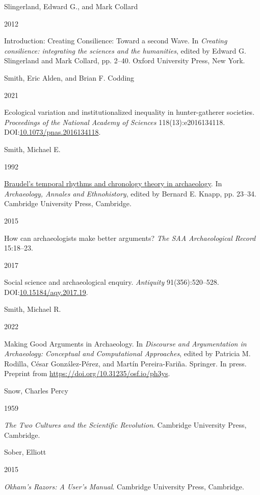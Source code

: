 \documentclass[
  12pt,
  a4paper,
  oneside]{book}
\newlength{\cslhangindent}
\newlength{\csllabelwidth}
\newlength{\cslentryspacingunit} %
\newenvironment{CSLReferences}[2] %
 {%
  \setlength{\parindent}{0pt}
  \ifodd #1
  \let\oldpar\par
  \def\par{\hangindent=\cslhangindent\oldpar}
  \fi
  \setlength{\parskip}{#2\cslentryspacingunit}
 }%
 {}
\newcommand{\CSLBlock}[1]{#1\hfill\break}
\newcommand{\CSLLeftMargin}[1]{\parbox[t]{\csllabelwidth}{#1}}
\newcommand{\CSLRightInline}[1]{\parbox[t]{\linewidth - \csllabelwidth}{#1}\break}
\begin{document}
\begin{CSLReferences}{0}{0}
\leavevmode{}%
\CSLBlock{Slingerland, Edward G., and Mark Collard}
\CSLLeftMargin{ 2012}%
\CSLRightInline{{Introduction: Creating Consilience: Toward a second Wave}. In \emph{{Creating consilience: integrating the sciences and the humanities}}, edited by Edward G. Slingerland and Mark Collard, pp. 2--40. Oxford University Press, New York.}

\leavevmode{}%
\CSLBlock{Smith, Eric Alden, and Brian F. Codding}
\CSLLeftMargin{ 2021}%
\CSLRightInline{{Ecological variation and institutionalized inequality in hunter-gatherer societies}. \emph{Proceedings of the National Academy of Sciences} 118(13):e2016134118. DOI:\href{https://doi.org/10.1073/pnas.2016134118}{10.1073/pnas.2016134118}.}

\leavevmode{}%
\CSLBlock{Smith, Michael E.}
\CSLLeftMargin{ 1992}%
\CSLRightInline{\href{https://doi.org/10.1017/CBO9780511759949}{{Braudel's temporal rhythms and chronology theory in archaeology}}. In \emph{{Archaeology, Annales and Ethnohistory}}, edited by Bernard E. Knapp, pp. 23--34. Cambridge University Press, Cambridge.}

\leavevmode{}%
\CSLLeftMargin{ 2015 }%
\CSLRightInline{{How can archaeologists make better arguments?} \emph{The SAA Archaeological Record} 15:18--23.}

\leavevmode{}%
\CSLLeftMargin{ 2017 }%
\CSLRightInline{{Social science and archaeological enquiry}. \emph{Antiquity} 91(356):520--528. DOI:\href{https://doi.org/10.15184/aqy.2017.19}{10.15184/aqy.2017.19}.}

\leavevmode{}%
\CSLBlock{Smith, Michael R.}
\CSLLeftMargin{ 2022}%
\CSLRightInline{{Making Good Arguments in Archaeology}. In \emph{{Discourse and Argumentation in Archaeology: Conceptual and Computational Approaches}}, edited by Patricia M. Rodilla, César González-Pérez, and Martín Pereira-Fariña. Springer. In press. Preprint from \url{https://doi.org/10.31235/osf.io/ph3ys}.}

\leavevmode{}%
\CSLBlock{Snow, Charles Percy}
\CSLLeftMargin{ 1959}%
\CSLRightInline{\emph{{The Two Cultures and the Scientific Revolution}}. Cambridge University Press, Cambridge.}

\leavevmode{}%
\CSLBlock{Sober, Elliott}
\CSLLeftMargin{ 2015}%
\CSLRightInline{\emph{{Okham's Razors: A User's Manual}}. Cambridge University Press, Cambridge.}


\end{CSLReferences}
\end{document}
